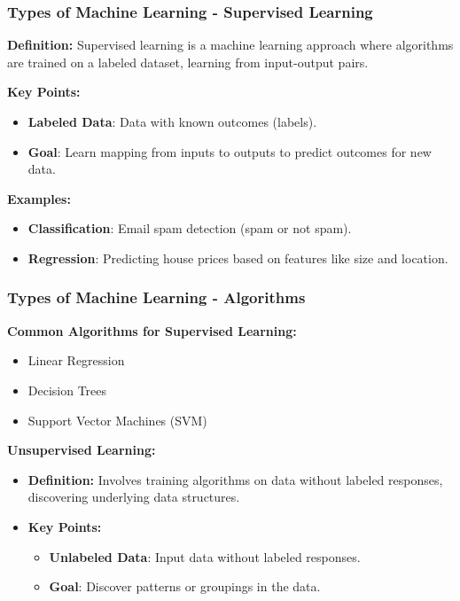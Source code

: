 \documentclass[aspectratio=169]{beamer}
\begin{document}
\begin{frame}[fragile]
    \frametitle{Types of Machine Learning - Supervised Learning}
    \textbf{Definition:} Supervised learning is a machine learning approach where algorithms are trained on a labeled dataset, learning from input-output pairs.

    \textbf{Key Points:}
    \begin{itemize}
        \item \textbf{Labeled Data}: Data with known outcomes (labels).
        \item \textbf{Goal}: Learn mapping from inputs to outputs to predict outcomes for new data.
    \end{itemize}

    \textbf{Examples:}
    \begin{itemize}
        \item \textbf{Classification}: Email spam detection (spam or not spam).
        \item \textbf{Regression}: Predicting house prices based on features like size and location.
    \end{itemize}
\end{frame}

\begin{frame}[fragile]
    \frametitle{Types of Machine Learning - Algorithms}
    \textbf{Common Algorithms for Supervised Learning:}
    \begin{itemize}
        \item Linear Regression
        \item Decision Trees
        \item Support Vector Machines (SVM)
    \end{itemize}
  
    \textbf{Unsupervised Learning:}
    \begin{itemize}
        \item \textbf{Definition:} Involves training algorithms on data without labeled responses, discovering underlying data structures.
        \item \textbf{Key Points:}
        \begin{itemize}
            \item \textbf{Unlabeled Data}: Input data without labeled responses.
            \item \textbf{Goal}: Discover patterns or groupings in the data.
        \end{itemize}
    \end{itemize}
\end{frame}
\end{document}
